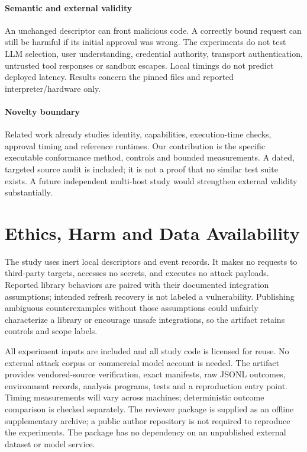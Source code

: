\paragraph{Semantic and external validity}
An unchanged descriptor can front malicious code. A correctly bound request can
still be harmful if its initial approval was wrong. The experiments do not test
LLM selection, user understanding, credential authority, transport authentication,
untrusted tool responses or sandbox escapes. Local timings do not predict deployed
latency. Results concern the pinned files and reported interpreter/hardware only.

\paragraph{Novelty boundary}
Related work already studies identity, capabilities, execution-time checks,
approval timing and reference runtimes. Our contribution is the specific executable
conformance method, controls and bounded measurements. A dated, targeted source
audit is included; it is not a proof that no similar test suite exists. A future
independent multi-host study would strengthen external validity substantially.

\section{Ethics, Harm and Data Availability}
The study uses inert local descriptors and event records. It makes no requests to
third-party targets, accesses no secrets, and executes no attack payloads. Reported
library behaviors are paired with their documented integration assumptions;
intended refresh recovery is not labeled a vulnerability. Publishing ambiguous
counterexamples without those assumptions could unfairly characterize a library
or encourage unsafe integrations, so the artifact retains controls and scope labels.

All experiment inputs are included and all study code is licensed for reuse.
No external attack corpus or commercial model account is needed. The artifact
provides vendored-source verification, exact manifests, raw JSONL outcomes,
environment records, analysis programs, tests and a reproduction entry point.
Timing measurements will vary across machines; deterministic outcome comparison
is checked separately. The reviewer package is supplied as an offline supplementary archive; a public author repository is not required to reproduce the experiments. The package has no dependency on an unpublished external dataset or model service.

